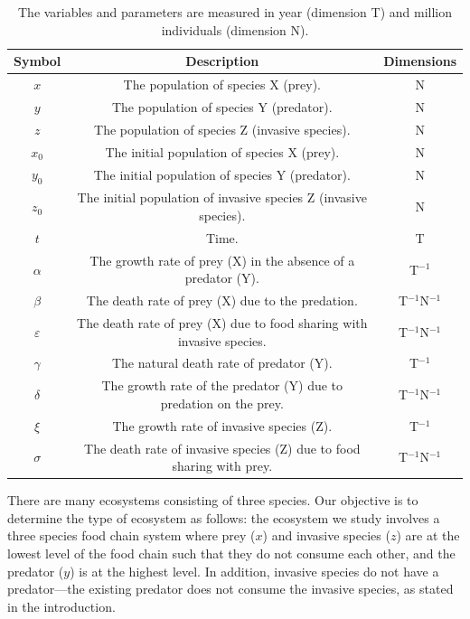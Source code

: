\documentclass{article}
\begin{document}
\begin{table}[!h]
\begin{center}
\begin{tabular}{||c | c | c||} 
 \hline
 Symbol & Description & Dimensions \\ [0.5ex] 
 \hline\hline
 $x$ & The population of species X (prey). & N \\ 
 \hline
 $y$ &  The population of species Y (predator).  & N \\ 
 \hline
 $z$ & The population of species Z (invasive species).  & N \\ 
 \hline
 $x_0$ &  The initial population of species X (prey). & N \\ 
 \hline
 $y_0$ & The initial population of species Y (predator).  & N \\ 
 \hline
 $z_0$ & The initial population of invasive species Z (invasive species).  & N \\ 
 \hline
 $t$ & Time.  & T \\ 
 \hline
 $\alpha$ & The growth rate of prey (X) in the absence of a predator (Y).  & T$^{-1}$ \\ 
 \hline
 $\beta$ & The death rate of prey (X) due to the predation.  & T$^{-1}$N$^{-1}$ \\
 \hline
 $\varepsilon$ & The death rate of prey (X) due to food sharing with invasive species. & T$^{-1}$N$^{-1}$ \\
 \hline
 $\gamma$ & The natural death rate of predator (Y).  & T$^{-1}$ \\
 \hline
 $\delta$ & The growth rate of the predator (Y) due to predation on the prey.   & T$^{-1}$N$^{-1}$ \\
 \hline
 $\xi$ & The growth rate of invasive species (Z). & T$^{-1}$ \\
 \hline
 $\sigma$ & The death rate of invasive species (Z) due to food sharing with prey. & T$^{-1}$N$^{-1}$ \\ [1ex] 
 \hline
\end{tabular} 
\end{center}
\captionsetup{font=small}
\caption{The variables and parameters are measured in year (dimension T) and million individuals (dimension N).} %
\end{table}

\noindent There are many ecosystems consisting of three species. Our objective is to determine the type of ecosystem as follows: the ecosystem we study involves a three species food chain system where prey ($x$) and invasive species ($z$) are at the lowest level of the food chain such that they do not consume each other, and the predator ($y$) is at the highest level. In addition, invasive species do not have a predator---the existing predator does not consume the invasive species, as stated in the introduction.
\end{document}
